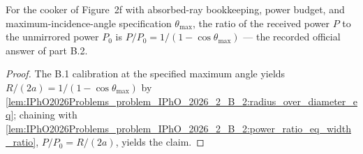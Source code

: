 \begin{theorem}
\label{thm:IPhO2026Problems_problem_IPhO_2026_2_B_2:power_ratio_in_terms_of_theta_max}
For the cooker of Figure~2f with absorbed-ray bookkeeping, power budget,
and maximum-incidence-angle specification $\theta_{\max}$, the ratio of
the received power $P$ to the unmirrored power $P_0$ is
$P / P_0 = 1 / (1 - \cos\theta_{\max})$ --- the recorded official
answer of part B.2.
\end{theorem}
\begin{proof}
The B.1 calibration at the specified maximum angle yields
$R/(2a) = 1/(1 - \cos\theta_{\max})$ by
\cref{lem:IPhO2026Problems_problem_IPhO_2026_2_B_2:radius_over_diameter_eq};
chaining with
\cref{lem:IPhO2026Problems_problem_IPhO_2026_2_B_2:power_ratio_eq_width_ratio},
$P/P_0 = R/(2a)$, yields the claim.
\end{proof}
